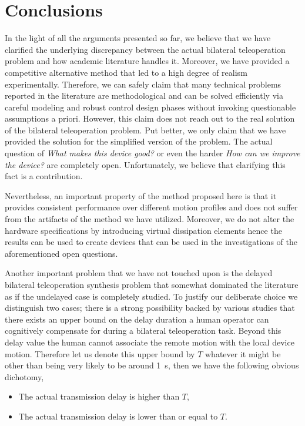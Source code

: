 \chapter{Conclusions}
\label{chap:conc}

In the light of all the arguments presented so far, we believe that we have clarified the underlying discrepancy between the actual bilateral 
teleoperation problem and how academic literature handles it. Moreover, we have provided a competitive alternative method that led to a high
degree of realism experimentally. Therefore, we can safely claim that many technical problems reported in the literature are methodological and 
can be solved efficiently via careful modeling and robust control design phases without invoking questionable assumptions a priori. 
However, this claim does not reach out to the real solution of the bilateral teleoperation problem. Put better, we only claim that we have provided
the solution for the simplified version of the problem. The actual question of \emph{What makes this device good?} or even the harder 
\emph{How can we improve the device?} are completely open. Unfortunately, we believe that clarifying this fact is a contribution.

Nevertheless, an important property of the method proposed here is that it provides consistent performance over different motion profiles and 
does not suffer from the artifacts of the method we have utilized. Moreover, we do not alter the hardware specifications by introducing 
virtual dissipation elements hence the results can be used to create devices that can be used in the investigations of the aforementioned 
open questions.  

Another important problem that we have not touched upon is the delayed bilateral teleoperation synthesis problem that somewhat dominated the
literature as if the undelayed case is completely studied. To justify our deliberate choice we distinguish two cases; there is a strong 
possibility backed by various studies that there exists an upper bound on the delay duration a human operator can cognitively compensate for 
during a bilateral teleoperation task. Beyond this delay value the human cannot associate the remote motion with the local device motion. 
Therefore let us denote this upper bound by $T$ whatever it might be other than being very likely to be around \SI{1}{\second}, then we 
have the following obvious dichotomy,

\begin{itemize}
	\item The actual transmission delay is higher than $T$,
    \item The actual transmission delay is lower than or equal to $T$.
\end{itemize}

